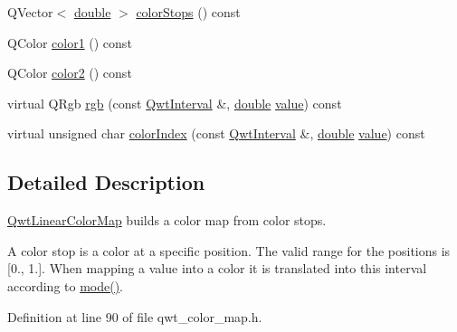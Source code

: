 \begin{DoxyCompactItemize}
\item 
Q\-Vector$<$ \hyperlink{_super_l_u_support_8h_a8956b2b9f49bf918deed98379d159ca7}{double} $>$ \hyperlink{class_qwt_linear_color_map_afaafe752db9de97ec6fba163515f51dd}{color\-Stops} () const 
\item 
Q\-Color \hyperlink{class_qwt_linear_color_map_a3ab5066b01409f58e4ad0425474b1530}{color1} () const 
\item 
Q\-Color \hyperlink{class_qwt_linear_color_map_a9fa696fff9ec599f0c305f73345ecab3}{color2} () const 
\item 
virtual Q\-Rgb \hyperlink{class_qwt_linear_color_map_ac031babccc90d8c857c707d0841ba1eb}{rgb} (const \hyperlink{class_qwt_interval}{Qwt\-Interval} \&, \hyperlink{_super_l_u_support_8h_a8956b2b9f49bf918deed98379d159ca7}{double} \hyperlink{glext_8h_aa0e2e9cea7f208d28acda0480144beb0}{value}) const 
\item 
virtual unsigned char \hyperlink{class_qwt_linear_color_map_aa69528213eb7d484466f095c8a9a6efe}{color\-Index} (const \hyperlink{class_qwt_interval}{Qwt\-Interval} \&, \hyperlink{_super_l_u_support_8h_a8956b2b9f49bf918deed98379d159ca7}{double} \hyperlink{glext_8h_aa0e2e9cea7f208d28acda0480144beb0}{value}) const 
\end{DoxyCompactItemize}


\subsection{Detailed Description}
\hyperlink{class_qwt_linear_color_map}{Qwt\-Linear\-Color\-Map} builds a color map from color stops. 

A color stop is a color at a specific position. The valid range for the positions is \mbox{[}0., 1.\mbox{]}. When mapping a value into a color it is translated into this interval according to \hyperlink{class_qwt_linear_color_map_a9ec309df6ec88472a63b14ac2c692c96}{mode()}. 

Definition at line 90 of file qwt\-\_\-color\-\_\-map.\-h.



